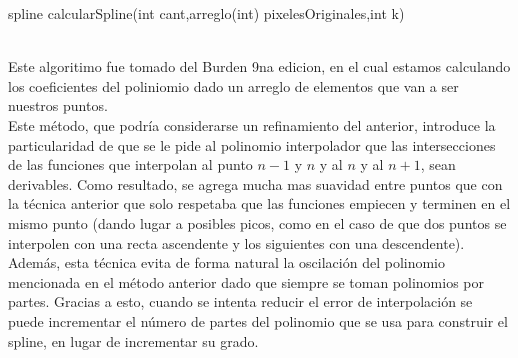 \begin{algorithm}
\begin{algorithmic}[1]\parskip=1mm
\caption{spline calcularSpline(int cant,arreglo(int) pixelesOriginales,int k)}
  \STATE{\quad$ (cs_{i} + 1] - cs[i]) / (3 * k)$}
\end{algorithmic}
\end{algorithm}\\

Este algoritimo fue tomado del Burden 9na edicion, en el cual estamos calculando los coeficientes del poliniomio dado un arreglo de elementos que van a ser nuestros puntos.\\

Este método, que podría considerarse un refinamiento del anterior, introduce la particularidad de que se le pide al polinomio interpolador que las intersecciones de las funciones que interpolan al punto $n-1$ y $n$ y al $n$ y al $n+1$, sean derivables. Como resultado, se agrega mucha mas suavidad entre puntos que con la técnica anterior que solo respetaba que las funciones empiecen y terminen en el mismo punto (dando lugar a posibles picos, como en el caso de que dos puntos se interpolen con una recta ascendente y los siguientes con una descendente). Además, esta técnica evita de forma natural la oscilación del polinomio mencionada en el método anterior dado que siempre se toman polinomios por partes. Gracias a esto, cuando se intenta reducir el error de interpolación se puede incrementar el número de partes del polinomio que se usa para construir el spline, en lugar de incrementar su grado.
